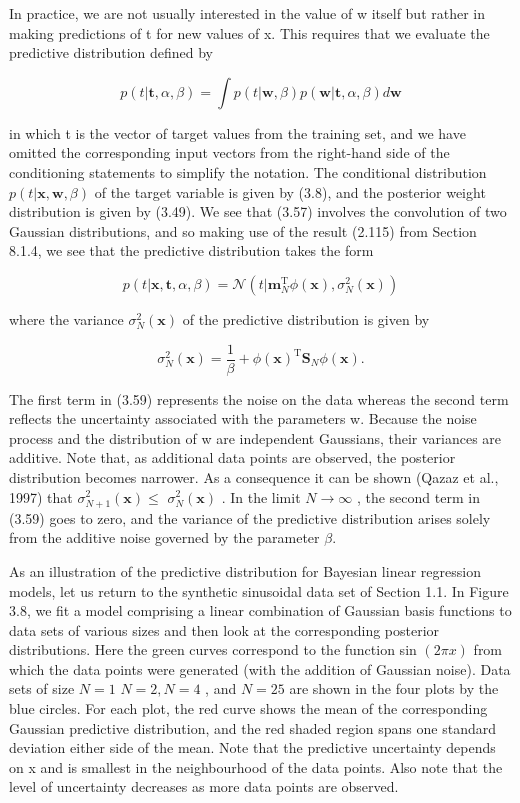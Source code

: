\documentclass[
  10
]{article}
\begin{document}
In practice, we are not usually interested in the value of w itself but
rather in making predictions of t for new values of x. This requires
that we evaluate the predictive distribution defined by

\[
p (t | \mathbf {t}, \alpha , \beta) = \int p (t | \mathbf {w}, \beta) p (\mathbf {w} | \mathbf {t}, \alpha , \beta) d \mathbf {w}\tag{3.57}
\]

in which t is the vector of target values from the training set, and we
have omitted the corresponding input vectors from the right-hand side of
the conditioning statements to simplify the notation. The conditional
distribution \(p ( t | \mathbf { x } , \mathbf { w } , \beta )\) of the
target variable is given by (3.8), and the posterior weight distribution
is given by (3.49). We see that (3.57) involves the convolution of two
Gaussian distributions, and so making use of the result (2.115) from
Section 8.1.4, we see that the predictive distribution takes the form

\[
p (t | \mathbf {x}, \mathbf {t}, \alpha , \beta) = \mathcal {N} (t | \mathbf {m} _ {N} ^ {\mathrm{T}} \phi (\mathbf {x}), \sigma_ {N} ^ {2} (\mathbf {x}))\tag{3.58}
\]

where the variance \(\sigma _ { N } ^ { 2 } ( \mathbf { x } )\) of the
predictive distribution is given by

\[
\sigma_ {N} ^ {2} (\mathbf {x}) = \frac {1}{\beta} + \phi (\mathbf {x}) ^ {\mathrm{T}} \mathbf {S} _ {N} \phi (\mathbf {x}).\tag{3.59}
\]

The first term in (3.59) represents the noise on the data whereas the
second term reflects the uncertainty associated with the parameters w.
Because the noise process and the distribution of w are independent
Gaussians, their variances are additive. Note that, as additional data
points are observed, the posterior distribution becomes narrower. As a
consequence it can be shown (Qazaz et al., 1997) that
\(\sigma _ { N + 1 } ^ { 2 } ( \mathbf { x } ) \leqslant\)
\(\sigma _ { N } ^ { 2 } ( \mathbf { x } )\) . In the limit
\(N \to \infty\) , the second term in (3.59) goes to zero, and the
variance of the predictive distribution arises solely from the additive
noise governed by the parameter \(\beta .\)

As an illustration of the predictive distribution for Bayesian linear
regression models, let us return to the synthetic sinusoidal data set of
Section 1.1. In Figure 3.8, we fit a model comprising a linear
combination of Gaussian basis functions to data sets of various sizes
and then look at the corresponding posterior distributions. Here the
green curves correspond to the function sin \(( 2 \pi x )\) from which
the data points were generated (with the addition of Gaussian noise).
Data sets of size \(N = 1\) \(N = 2 , N = 4\) , and \(N = 2 5\) are
shown in the four plots by the blue circles. For each plot, the red
curve shows the mean of the corresponding Gaussian predictive
distribution, and the red shaded region spans one standard deviation
either side of the mean. Note that the predictive uncertainty depends on
x and is smallest in the neighbourhood of the data points. Also note
that the level of uncertainty decreases as more data points are
observed.
\end{document}
